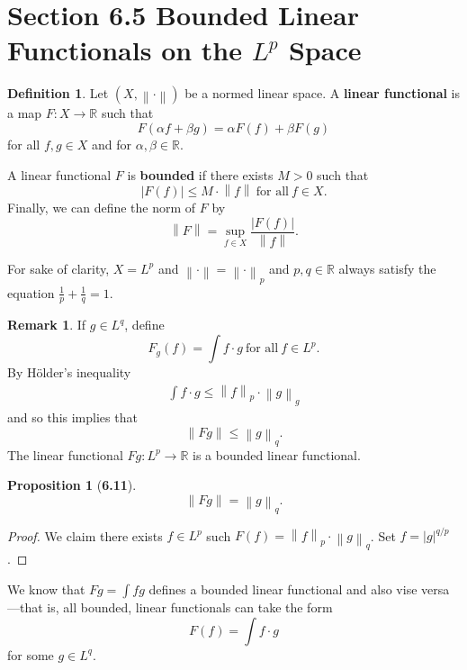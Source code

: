 \documentclass[12pt]{article}
\newcommand{\R}{\mathbb{R}}
\newcommand{\norm}[1]{\left\lVert #1 \right\rVert}
\theoremstyle{definition}
\newtheorem*{definition}{Definition}
\newtheorem*{prop}{Proposition}
\newtheorem*{remark}{Remark}
\begin{document}
\section*{Section 6.5 Bounded Linear Functionals on the \( L^p \) Space}

\begin{definition}
    Let \( \left(X, \norm{\cdot}\right)\) be a normed linear space. 
    A \textbf{linear functional} is a map \( F: X \to \R \) such that 
        \[
            F(\alpha f + \beta g) = \alpha F(f) + \beta F(g) 
        \]
    for all \( f,g \in X\) and for \( \alpha, \beta \in \R \). 

    A linear functional \( F \) is \textbf{bounded} if there exists \( M > 0 \) such that
        \[
            \left| F(f) \right| \leq M \cdot \norm{f} \ \text{for all} \ f \in X.
        \]
    Finally, we can define the norm of \( F \) by
        \[
            \norm{F} = \sup_{f \in X} \frac{|F(f)|}{\norm{f}}.  
        \]
        
\end{definition}

For sake of clarity, \( X = L^p \) and \( \norm{\cdot} = \norm{\cdot}_{p} \) 
and \( p, q \in \R \) always satisfy the equation \( \displaystyle \frac{1}{p}  + \frac{1}{q} = 1 \).
\begin{remark}
    If \( g \in L^q \), define
        \[
            F_{g}(f) = \int f \cdot g \ \text{for all} \ f \in L^p.  
        \]
    By H\"{o}lder's inequality
        \begin{align*}
            \int f \cdot g \leq \norm{f}_{p} \cdot \norm{g}_{g}
        \end{align*}
    and so this implies that 
        \[
            \norm{Fg} \leq \norm{g}_{q}.
        \]
    The linear functional \( Fg: L^p \to \R \) is a bounded linear functional. 
\end{remark}

\begin{prop}[\textbf{6.11}]

    \[
        \norm{Fg} = \norm{g}_{q}.  
    \]
        \begin{proof}
            We claim there exists \( f \in L^p \) such \( F(f) = \norm{f}_{p}\cdot \norm{g}_{q} \).
            Set \( f = |g|^{q/p}\). 
        \end{proof}

\end{prop}

We know that \( \displaystyle Fg = \int fg \) defines a bounded linear functional
and also vise versa---that is, all bounded, linear functionals can take the form 
    \[
        F(f) = \int f \cdot g  
    \]
for some \( g \in L^q \).
\end{document}
